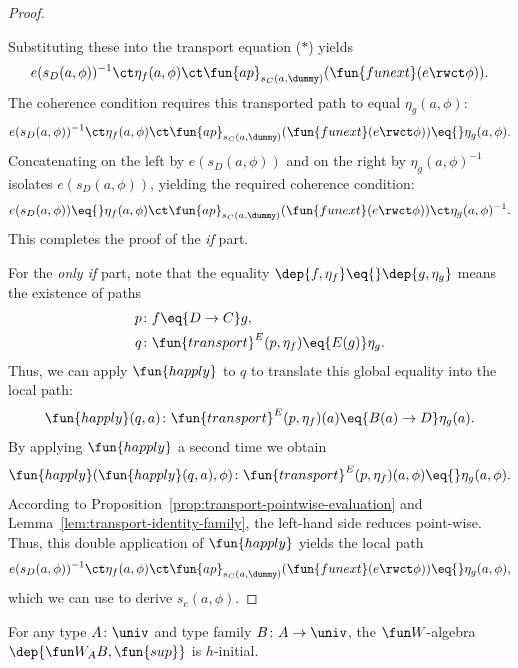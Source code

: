 \begin{proof}
\begin{enumerate}[a),font=\upshape]
    \end{enumerate}
    Substituting these into the transport equation ($\ast$) yields
    \[
        e(s_D(a,\phi))^{-1}
        \ct\eta_f(a,\phi)
        \ct\fun{ap}_{s_C(a,\dummy)}
            (
                \fun{funext}(e\rwct\phi)
            ).
    \]
    The coherence condition requires this transported path to equal $\eta_g(a,\phi)$:
    \[
        e(s_D(a,\phi))^{-1} \ct \eta_f(a,\phi) \ct \fun{ap}_{s_C(a,\dummy)}(\fun{funext}(e\rwct\phi)) \eq{} \eta_g(a,\phi).
    \]
    Concatenating on the left by $e(s_D(a,\phi))$ and on the right by $\eta_g(a,\phi)^{-1}$ isolates $e(s_D(a,\phi))$, yielding the required coherence condition:
    \[
        e(s_D(a,\phi))
        \eq{}
        \eta_f(a,\phi)
            \ct\fun{ap}_{s_C(a,\dummy)}
                (
                    \fun{funext}(e\rwct\phi)
                )
            \ct\eta_g(a,\phi)^{-1}.
    \]
    This completes the proof of the \textit{if} part.
    
    For the \textit{only if} part, note that the equality $\dep{f,\eta_f}\eq{}\dep{g,\eta_g}$ means the existence of paths
    \begin{align*}
        p&\colon f\eq{D\to C}g,\\
        q&\colon
            \fun{transport}^E(p,\eta_f)
            \eq{E(g)}
            \eta_g.
    \end{align*}
    Thus, we can apply $\fun{happly}$ to $q$ to translate this global equality into the local path:
    \[
        \fun{happly}(q,a)\colon
            \fun{transport}^E(p,\eta_f)(a)
            \eq{B(a)\to D}
            \eta_g(a).
    \]
    By applying $\fun{happly}$ a second time we obtain
    \[
        \fun{happly}(\fun{happly}(q,a),\phi)\colon
        \fun{transport}^E(p,\eta_f)(a,\phi)
        \eq{}
        \eta_g(a,\phi).
    \]
    According to Proposition~\ref{prop:transport-pointwise-evaluation} and Lemma~\ref{lem:transport-identity-family}, the left-hand side reduces point-wise. Thus, this double application of $\fun{happly}$ yields the local path 
    \[
        e(s_D(a,\phi))^{-1}
        \ct\eta_f(a,\phi)
        \ct\fun{ap}_{s_C(a,\dummy)}
            (
                \fun{funext}(e\rwct\phi)
            )\eq{}\eta_g(a,\phi),
    \]
    which we can use to derive $s_e(a,\phi)$.
\end{proof}

\begin{thm}
    For any type $A\colon\univ$ and type family $B\colon A\to\univ$, the $\fun W$-algebra $\dep{\fun W_AB,\fun{sup}}$ is $h$-initial.
\end{thm}

